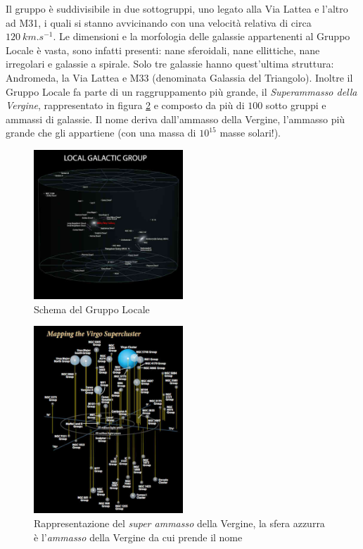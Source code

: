 \noindent Il gruppo è suddivisibile in due sottogruppi, uno legato alla Via Lattea e l’altro ad M31, i quali si stanno avvicinando con una velocità relativa di circa $\SI{120}{km.s^{-1}}$.
Le dimensioni e la morfologia delle galassie appartenenti al Gruppo Locale è vasta, sono infatti presenti: nane sferoidali, nane ellittiche, nane irregolari e galassie a spirale. Solo tre galassie hanno quest’ultima struttura: Andromeda, la Via Lattea e M33 (denominata Galassia del Triangolo).
Inoltre il Gruppo Locale fa parte di un raggruppamento più grande, il \emph{Superammasso della Vergine}, rappresentato in figura \ref{fig:virgo-cluster} e composto da più di $100$ sotto gruppi e ammassi di galassie. Il nome deriva dall’ammasso della Vergine, l'ammasso più grande che gli appartiene (con una massa di $10^{15}$ masse solari!).
\begin{figure}
    \centering
    \includegraphics[width = 0.5\textwidth]{immagini/Gruppo-Locale.jpg}
    \caption{Schema del Gruppo Locale}
    \label{fig:gruppo-locale}
\end{figure}
\begin{figure}
    \centering
    \includegraphics[width = 0.5\textwidth]{immagini/virgo-cluster.jpg}
    \caption{Rappresentazione del \emph{super ammasso} della Vergine, la sfera azzurra è l'\emph{ammasso} della Vergine da cui prende il nome}
    \label{fig:virgo-cluster}
\end{figure}
